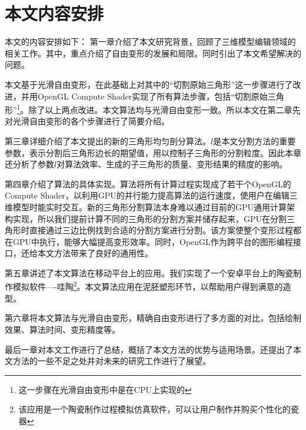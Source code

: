 \section{本文内容安排}
本文的内容安排如下：
第一章介绍了本文研究背景，回顾了三维模型编辑领域的相关工作。其中，重点介绍了自由变形的发展和局限。同时引出了本文希望解决的问题。

本文基于光滑自由变形，在此基础上对其中的“切割原始三角形”这一步骤进行了改进，并用OpenGL Compute Shader实现了所有算法步骤，包括“切割原始三角形”\footnote{这一步骤在光滑自由变形中是在CPU上实现的}。除了以上两点改进。本文算法均与光滑自由变形一致。所以本文在第二章先对光滑自由变形\cite{Cui15}的各个步骤进行了简要介绍。

第三章详细介绍了本文提出的新的三角形均匀剖分算法。$l$是本文分割方法的重要参数，表示分割后三角形边长的期望值，用以控制子三角形的分割粒度。因此本章还分析了参数$l$对算法效率、生成的子三角形的质量、变形结果的精度的影响。

第四章介绍了算法的具体实现。算法将所有计算过程实现成了若干个OpenGL的Compute Shader，以利用GPU的并行能力提高算法的运行速度，使用户在编辑三维模型时能实时交互。新的三角形分割算法本身难以通过目前的GPU通用计算架构实现，所以我们提前计算不同的三角形的分割方案并储存起来，GPU在分割三角形时直接通过三边比例找到合适的分割方案进行分割。该方案使整个变形过程都在GPU中执行，能够大幅提高变形效率。同时，OpenGL作为跨平台的图形编程接口，还给本文方法带来了良好的通用性。

第五章讲述了本文算法在移动平台上的应用。我们实现了一个安卓平台上的陶瓷制作模拟软件----哇陶\footnote{该应用是一个陶瓷制作过程模拟仿真软件，可以让用户制作并购买个性化的瓷器}。本文算法应用在泥胚塑形环节，以帮助用户得到满意的造型。

第六章将本文算法与光滑自由变形\cite{Cui15}，精确自由变形\cite{Feng00}进行了多方面的对比，包括绘制效果、算法时间、变形精度等。

最后一章对本文工作进行了总结，概括了本文方法的优势与适用场景。还提出了本文方法的一些不足之处并对未来的研究工作进行了展望。





